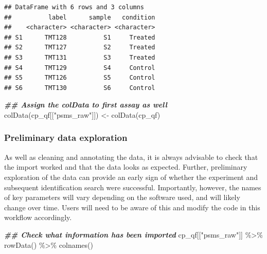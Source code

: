 \documentclass[9pt,a4paper,]{extarticle}
\newenvironment{Shaded}{\begin{snugshade}}{\end{snugshade}}
\newcommand{\DocumentationTok}[1]{\textcolor[rgb]{0.56,0.35,0.01}{\textbf{\textit{#1}}}}
\newcommand{\FunctionTok}[1]{\textcolor[rgb]{0.00,0.00,0.00}{#1}}
\newcommand{\NormalTok}[1]{#1}
\newcommand{\OtherTok}[1]{\textcolor[rgb]{0.56,0.35,0.01}{#1}}
\newcommand{\SpecialCharTok}[1]{\textcolor[rgb]{0.00,0.00,0.00}{#1}}
\newcommand{\StringTok}[1]{\textcolor[rgb]{0.31,0.60,0.02}{#1}}
\begin{document}
\begin{verbatim}
## DataFrame with 6 rows and 3 columns
##          label      sample   condition
##    <character> <character> <character>
## S1      TMT128          S1     Treated
## S2      TMT127          S2     Treated
## S3      TMT131          S3     Treated
## S4      TMT129          S4     Control
## S5      TMT126          S5     Control
## S6      TMT130          S6     Control
\end{verbatim}

\begin{Shaded}
\begin{Highlighting}[]
\DocumentationTok{\#\# Assign the colData to first assay as well}
\FunctionTok{colData}\NormalTok{(cp\_qf[[}\StringTok{"psms\_raw"}\NormalTok{]]) }\OtherTok{\textless{}{-}} \FunctionTok{colData}\NormalTok{(cp\_qf)}
\end{Highlighting}
\end{Shaded}

\hypertarget{preliminary-data-exploration}{%
\subsubsection{Preliminary data exploration}\label{preliminary-data-exploration}}

As well as cleaning and annotating the data, it is always advisable to check
that the import worked and that the data looks as expected. Further, preliminary
exploration of the data can provide an early sign of whether the experiment and
subsequent identification search were successful. Importantly, however, the
names of key parameters will vary depending on the software used, and will
likely change over time. Users will need to be aware of this and modify the code
in this workflow accordingly.

\begin{Shaded}
\begin{Highlighting}[]
\DocumentationTok{\#\# Check what information has been imported}
\NormalTok{cp\_qf[[}\StringTok{"psms\_raw"}\NormalTok{]] }\SpecialCharTok{\%\textgreater{}\%}
  \FunctionTok{rowData}\NormalTok{() }\SpecialCharTok{\%\textgreater{}\%}
  \FunctionTok{colnames}\NormalTok{()}
\end{Highlighting}
\end{Shaded}
\end{document}
